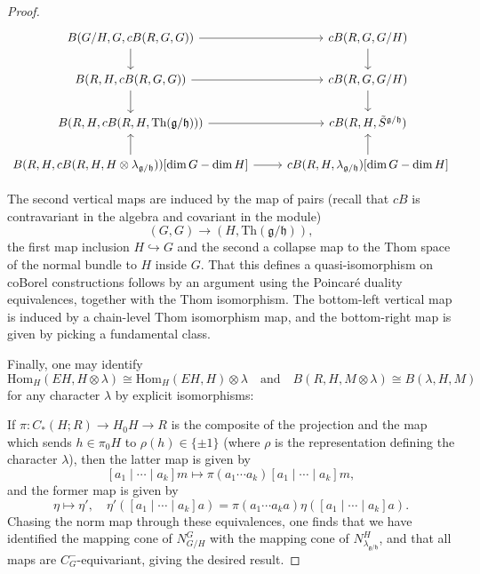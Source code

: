 \documentclass{memo-l}
\theoremstyle{definition}
\theoremstyle{remark}
\numberwithin{section}{chapter}
\numberwithin{equation}{chapter}
\begin{document}
\begin{proof}
\[\begin{tikzcd}
	{B(G/H, G, cB(R, G, G)) } & {cB(R, G, G/H)} \\
	{B(R, H, cB(R,G,G))} & {cB(R, G, G/H)} \\
	{B(R, H, cB(R, H, \text{Th}(\mathfrak g/\mathfrak h)))} & {cB(R, H, \tilde S^{\mathfrak g/\mathfrak h})} \\
	{B(R,H, cB(R,H,H\otimes \lambda_{\mathfrak g/\mathfrak h}))[\dim G - \dim H]} & {cB(R, H, \lambda_{\mathfrak g/\mathfrak h})[\dim G - \dim H]}
	\arrow[from=1-1, to=1-2]
	\arrow[from=1-1, to=2-1]
	\arrow[from=1-2, to=2-2]
	\arrow[from=2-1, to=2-2]
	\arrow[from=2-1, to=3-1]
	\arrow[from=4-1, to=3-1]
	\arrow[from=3-1, to=3-2]
	\arrow[from=2-2, to=3-2]
	\arrow[from=4-2, to=3-2]
	\arrow[from=4-1, to=4-2]
\end{tikzcd}\]

The second vertical maps are induced by the map of pairs (recall that $cB$ is contravariant in the algebra and covariant in the module) $$(G,G) \to \left(H, \text{Th}(\mathfrak g/\mathfrak h)\right),$$ the first map inclusion $H \hookrightarrow G$ and the second a collapse map to the Thom space of the normal bundle to $H$ inside $G$. That this defines a quasi-isomorphism on coBorel constructions follows by an argument using the Poincar\'e duality equivalences, together with the Thom isomorphism. The bottom-left vertical map is induced by a chain-level Thom isomorphism map, and the bottom-right map is given by picking a fundamental class. 

Finally, one may identify $$\text{Hom}_H(EH, H \otimes \lambda) \cong \text{Hom}_H(EH, H) \otimes \lambda \quad \text{and} \quad B(R, H, M \otimes \lambda) \cong B(\lambda, H, M)$$ for any character $\lambda$ by explicit isomorphisms:

If $\pi: C_*(H;R) \to H_0 H \to R$ is the composite of the projection and the map which sends $h \in \pi_0 H$ to $\rho(h) \in \{\pm 1\}$ (where $\rho$ is the representation defining the character $\lambda$), then the latter map is given by $$[a_1 \mid \cdots \mid a_k] m \mapsto \pi(a_1 \cdots a_k) [a_1 \mid \cdots \mid a_k] m,$$ and the former map is given by $$\eta \mapsto \eta', \quad \eta'([a_1 \mid \cdots \mid a_k]a) = \pi(a_1 \cdots a_k a)\eta([a_1 \mid \cdots \mid a_k] a).$$ Chasing the norm map through these equivalences, one finds that we have identified the mapping cone of $N^G_{G/H}$ with the mapping cone of $N^H_{\lambda_{\mathfrak g/\mathfrak h}}$, and that all maps are $C^-_G$-equivariant, giving the desired result. 
\end{proof}
\end{document}
